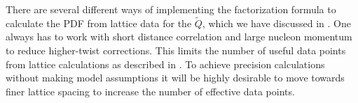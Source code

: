 There are several different ways of implementing the factorization formula to calculate the PDF from lattice data for the \spcorr $\tilde Q$, which we have discussed in . One always has to work with short distance correlation and large nucleon momentum to reduce higher-twist corrections. This limits the number of useful data points from lattice calculations as described in .  To achieve precision calculations without making model assumptions it will be highly desirable to move towards finer lattice spacing to increase the number of effective data points.
